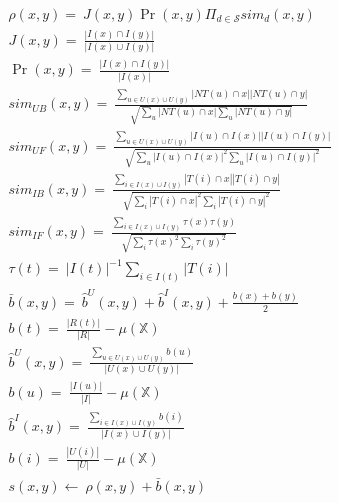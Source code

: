 \begin{gather}
    \rho(x,y)=~ J(x,y)\Pr(x,y) \Pi_{d \in \mathcal{S}} sim_{d}(x,y) \label{eq:tags_dist}  \\
    J(x,y)=~ \frac{|I(x)\cap I(y)|}{|I(x)\cup I(y)|} \nonumber  \\
    \Pr(x,y)=~ \frac{|I(x)\cap I(y)|}{|I(x)|} \nonumber \\ 
    sim_{UB}(x,y)=~ 
    \frac{\sum_{u\in U(x)\cup U(y)}|NT(u) \cap x| |NT(u) \cap y|}
    {\sqrt{\sum_{u}|NT(u) \cap x|\sum_{u}|NT(u) \cap y|}} \nonumber \\
    sim_{UF}(x,y)=~ 
    \frac{\sum_{u \in U(x)\cup U(y)}|I(u)\cap I(x)| |I(u)\cap I(y)|}
    {\sqrt{\sum_{u}|I(u)\cap I(x)|^{2}\sum_{u}|I(u)\cap I(y)|^{2}}} \nonumber \\
    sim_{IB}(x,y)=~ 
    \frac{\sum_{i\in I(x)\cup I(y)}|T(i)\cap x| |T(i) \cap y|}
    {\sqrt{\sum_{i}|T(i)\cap x|^{2}\sum_{i}|T(i)\cap y|^{2}}} \nonumber \\ 
    sim_{IF}(x,y)=~ 
    \frac{\sum_{i\in I(x)\cup I(y)}\tau(x) \tau(y)}
    {\sqrt{\sum_{i}\tau(x)^{2}\sum_{i}\tau(y)^{2}}} \nonumber \\
    \tau(t)=~ |I(t)|^{-1}\sum_{i \in I(t)}|T(i)| \nonumber \\ 
    \bar{b}(x,y) =~ \hat{b}^{U}(x,y) + \hat{b}^{I}(x,y) + \frac{b(x) + b(y)}{2} \label{eq:tendencies_scores} \\
    b(t) =~ \frac{|R(t)|}{|R|} - \mu(\mathbb{X}) \nonumber \\
    \hat{b}^{U}(x,y) =~ \frac{\sum_{u \in U(x) \cup U(y)} b(u)}{|U(x) \cup U(y)|} \nonumber \\
    b(u) =~ \frac{|I(u)|}{|I|} - \mu (\mathbb{X}) \nonumber \\
    \hat{b}^{I}(x,y) =~ \frac{\sum_{i \in I(x) \cup I(y)} b(i)}{|I(x) \cup I(y)|} \nonumber \\
    b(i) =~ \frac{|U(i)|}{|U|} - \mu (\mathbb{X}) \nonumber \\
    s(x,y) \leftarrow ~  \rho(x,y) + \bar{b}(x,y) \label{eq:tags_scores_rev}
\end{gather}